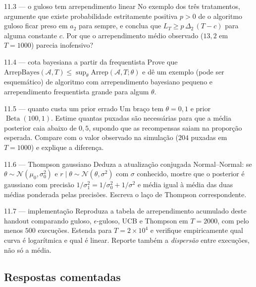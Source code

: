 \documentclass[11pt, a4paper]{article}
\newcommand{\arrep}{\mathrm{Arrep}}
\newcommand{\arrepb}{\mathrm{ArrepBayes}}
\newcommand{\alg}{\mathcal{A}}
\newcommand{\Bdist}{\operatorname{Beta}}
\newcommand{\Nrm}{\mathcal{N}}
\begin{document}
\begin{exbox}{11.3 — o guloso tem arrependimento linear}
No exemplo dos três tratamentos, argumente que existe probabilidade
estritamente positiva $p > 0$ de o algoritmo guloso ficar preso em $a_2$ para
sempre, e conclua que $L_T \ge p\,\Delta_2\,(T - c)$ para alguma constante $c$.
Por que o arrependimento médio observado ($13{,}2$ em $T=1000$) parecia
inofensivo?
\end{exbox}

\begin{exbox}{11.4 — cota bayesiana a partir da frequentista}
Prove que $\arrepb(\alg,T) \le \sup_\theta \arrep(\alg,T;\theta)$ e dê um
exemplo (pode ser esquemático) de algoritmo com arrependimento bayesiano
pequeno e arrependimento frequentista grande para algum $\theta$.
\end{exbox}

\begin{exbox}{11.5 — quanto custa um prior errado}
Um braço tem $\theta = 0{,}1$ e prior $\Bdist(100,1)$. Estime quantas puxadas
são necessárias para que a média posterior caia abaixo de $0{,}5$, supondo que
as recompensas saiam na proporção esperada. Compare com o valor observado na
simulação ($204$ puxadas em $T=1000$) e explique a diferença.
\end{exbox}

\begin{exbox}{11.6 — Thompson gaussiano}
Deduza a atualização conjugada Normal--Normal: se
$\theta \sim \Nrm(\mu_0,\sigma_0^2)$ e $r \mid \theta \sim \Nrm(\theta,\sigma^2)$
com $\sigma$ conhecido, mostre que o posterior é gaussiano com precisão
$1/\sigma_1^2 = 1/\sigma_0^2 + 1/\sigma^2$ e média igual à média das duas
médias ponderada pelas precisões. Escreva o laço de Thompson correspondente.
\end{exbox}

\begin{exbox}{11.7 — implementação}
Reproduza a tabela de arrependimento acumulado deste handout comparando guloso,
$\epsilon$-guloso, UCB e Thompson em $T = 2000$, com pelo menos $500$ execuções.
Estenda para $T = 2\times 10^4$ e verifique empiricamente qual curva é
logarítmica e qual é linear. Reporte também a \emph{dispersão} entre execuções,
não só a média.
\end{exbox}

\subsection*{Respostas comentadas}
\end{document}
